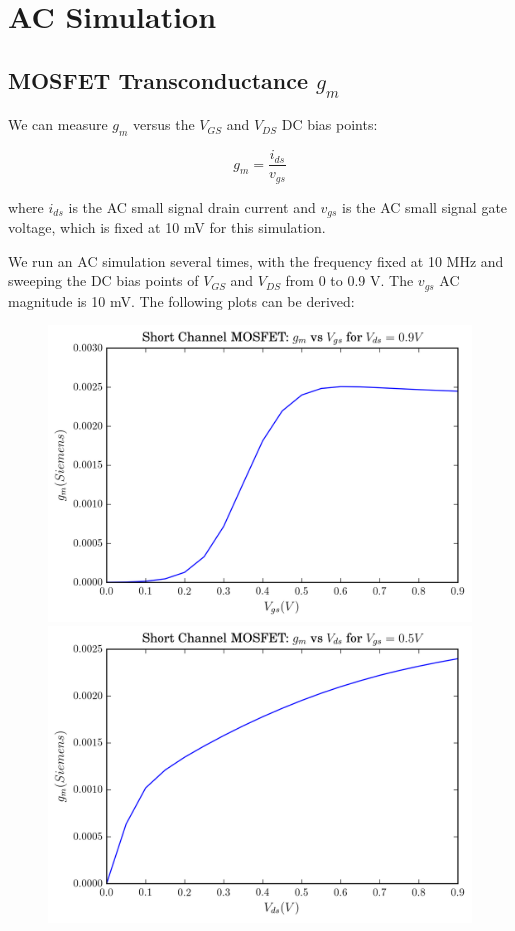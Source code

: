 \documentclass[11pt]{article}
\begin{document}
\section{AC Simulation}
\subsection{MOSFET Transconductance $g_m$}
We can measure $g_m$ versus the $V_{GS}$ and $V_{DS}$ DC bias points:

\begin{equation*}
	g_m = \frac{i_{ds}}{v_{gs}}
\end{equation*}

where $i_{ds}$ is the AC small signal drain current and $v_{gs}$ is the AC small signal gate voltage, which is fixed at 10 mV for this simulation.

We run an AC simulation several times, with the frequency fixed at 10 MHz and sweeping the DC bias points of $V_{GS}$ and $V_{DS}$ from 0 to 0.9 V. The $v_{gs}$ AC magnitude is 10 mV. The following plots can be derived:

\begin{figure}[H]
	\includegraphics[width=\linewidth]{images/short_channel_gm_vs_vgs.png}
	\endminipage\hfill
	\includegraphics[width=\linewidth]{images/short_channel_gm_vs_vds.png}
	\endminipage
\end{figure}
\end{document}
